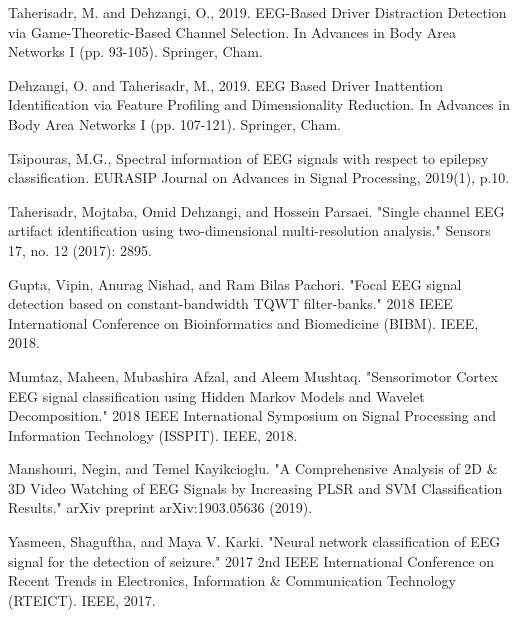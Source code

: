 \documentclass{article}
\begin{document}
\begin{small}


\begin{thebibliography}{00}
\vspace{-2mm}

Taherisadr, M. and Dehzangi, O., 2019. EEG-Based Driver Distraction Detection via Game-Theoretic-Based Channel Selection. In Advances in Body Area Networks I (pp. 93-105). Springer, Cham.
\vspace{-5pt}

Dehzangi, O. and Taherisadr, M., 2019. EEG Based Driver Inattention Identification via Feature Profiling and Dimensionality Reduction. In Advances in Body Area Networks I (pp. 107-121). Springer, Cham.
\vspace{-5pt}



Tsipouras, M.G., Spectral information of EEG signals with respect to epilepsy classification. EURASIP Journal on Advances in Signal Processing, 2019(1), p.10.
\vspace{-5pt}

Taherisadr, Mojtaba, Omid Dehzangi, and Hossein Parsaei. "Single channel EEG artifact identification using two-dimensional multi-resolution analysis." Sensors 17, no. 12 (2017): 2895.
\vspace{-5pt}


Gupta, Vipin, Anurag Nishad, and Ram Bilas Pachori. "Focal EEG signal detection based on constant-bandwidth TQWT filter-banks." 2018 IEEE International Conference on Bioinformatics and Biomedicine (BIBM). IEEE, 2018.
\vspace{-5pt}


Mumtaz, Maheen, Mubashira Afzal, and Aleem Mushtaq. "Sensorimotor Cortex EEG signal classification using Hidden Markov Models and Wavelet Decomposition." 2018 IEEE International Symposium on Signal Processing and Information Technology (ISSPIT). IEEE, 2018.
\vspace{-5pt}


Manshouri, Negin, and Temel Kayikcioglu. "A Comprehensive Analysis of 2D \& 3D Video Watching of EEG Signals by Increasing PLSR and SVM Classification Results." arXiv preprint arXiv:1903.05636 (2019).
\vspace{-5pt}


Yasmeen, Shaguftha, and Maya V. Karki. "Neural network classification of EEG signal for the detection of seizure." 2017 2nd IEEE International Conference on Recent Trends in Electronics, Information \& Communication Technology (RTEICT). IEEE, 2017.
\vspace{-5pt}


\end{thebibliography}
\end{small}
\end{document}
